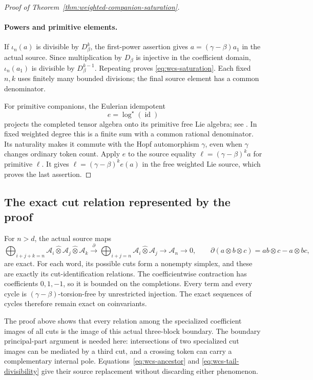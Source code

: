 \documentclass[11pt]{article}
\theoremstyle{definition}\newtheorem{definition}[theorem]{Definition}
\begin{document}
\begin{proof}[Proof of Theorem~\ref{thm:weighted-companion-saturation}]
\paragraph{Powers and primitive elements.}
If \(\iota_n(a)\) is divisible by \(D_\beta^k\), the
first-power assertion gives \(a=(\gamma-\beta)a_1\)
in the actual source.  Since multiplication by
\(D_\beta\) is injective in the coefficient domain,
\(\iota_n(a_1)\) is divisible by \(D_\beta^{k-1}\).
Repeating proves \eqref{eq:wcs-saturation}.  Each fixed
\(n,k\) uses finitely many bounded divisions; the final
source element has a common denominator.

For primitive companions, the Eulerian idempotent
\[
 e=\log^\star(\operatorname{id})
 \]
projects the completed tensor algebra onto its primitive
free Lie algebra; see \cite[\S1.1, p.~2]{BandieraSchaetz}.
In fixed weighted degree this is a finite sum with a
common rational denominator.  Its naturality makes it
commute with the Hopf automorphism \(\gamma\), even when
\(\gamma\) changes ordinary token count.  Apply \(e\)
to the source equality
\(\ell=(\gamma-\beta)^k a\) for primitive \(\ell\).
It gives
\(\ell=(\gamma-\beta)^k e(a)\) in the free weighted
Lie source, which proves the last assertion.
\end{proof}

\subsection{The exact cut relation represented by the proof}

For \(n>d\), the actual source maps
\[
 \bigoplus_{i+j+k=n}\mathcal A_i\widehat\otimes
       \mathcal A_j\widehat\otimes\mathcal A_k
 \xrightarrow{\ \partial\ }
 \bigoplus_{i+j=n}\mathcal A_i\widehat\otimes\mathcal A_j
 \longrightarrow\mathcal A_n\longrightarrow0,
 \qquad
 \partial(a\otimes b\otimes c)=ab\otimes c-a\otimes bc,
\]
are exact.  For each word, its possible cuts form a
nonempty simplex, and these are exactly its cut-identification
relations.  The coefficientwise contraction has coefficients
\(0,1,-1\), so it is bounded on the completions.
Every term and every cycle is \((\gamma-\beta)\)-torsion-free
by unrestricted injection.  The exact sequences of cycles
therefore remain exact on coinvariants.

The proof above shows that every relation among the
specialized coefficient images of all cuts is the image
of this actual three-block boundary.  The boundary
principal-part argument is needed here: intersections
of two specialized cut images can be mediated by a
third cut, and a crossing token can carry a complementary
internal pole.  Equations~\eqref{eq:wcs-ancestor} and
\eqref{eq:wcs-tail-divisibility} give their source
replacement without discarding either phenomenon.
\end{document}
